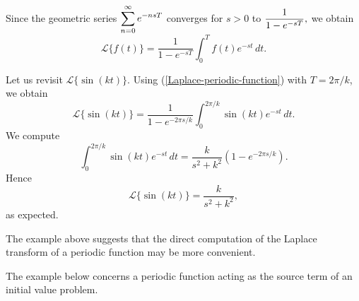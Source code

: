  Since the geometric series \(\displaystyle \sum_{n=0}^\infty e^{-nsT}\) converges for $s>0$ to \(\displaystyle \frac{1}{1- e^{-sT}},\)
  we obtain
  \begin{equation}\label{Laplace-periodic-function}
  	\boxed{\mathscr{L}\{f(t)\} = \frac{1}{1- e^{-sT}}\int_0^T f(t) e^{-st}\, dt.}
  \end{equation}
 
\begin{example}
	Let us revisit $\mathscr{L}\{\sin(kt)\}.$ Using (\ref{Laplace-periodic-function}) with $T= 2\pi/k$, we obtain
\[	\mathscr{L}\{\sin(kt)\} = \frac{1}{1- e^{-2\pi s/k}}\int_0^{2\pi/k} \sin(kt) e^{-st}\, dt.\]
We compute 
\[\int_0^{2\pi/k} \sin(kt) e^{-st}\, dt=\frac{k}{s^2+k^2}\left( 1- e^{-2\pi s/k}\right).\]
Hence \[ \mathscr{L}\{\sin(kt)\} =\frac{k}{s^2+k^2},\]
as expected.
\end{example}
The example above suggests that  the direct computation of the Laplace transform of a periodic function may  be more convenient.

The example below concerns a periodic function acting as the source term of an initial value problem.

